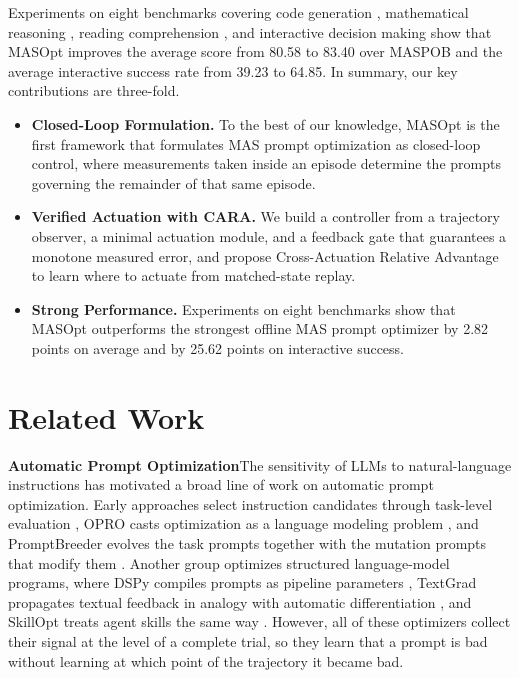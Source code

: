 \documentclass{article}
\theoremstyle{definition}
\begin{document}
Experiments on eight benchmarks covering code generation \citep{chen2021humaneval,austin2021mbpp}, mathematical reasoning \citep{cobbe2021gsm8k,hendrycks2021math}, reading comprehension \citep{yang2018hotpotqa,dua2019drop}, and interactive decision making \citep{shridhar2020alfworld,prasad2024textcraft} show that MASOpt improves the average score from 80.58 to 83.40 over MASPOB \citep{hong2026maspob} and the average interactive success rate from 39.23 to 64.85. In summary, our key contributions are three-fold.
\begin{itemize}[leftmargin=1em, itemsep=-1ex, topsep=0ex]
    \item \textbf{Closed-Loop Formulation.} To the best of our knowledge, MASOpt is the first framework that formulates MAS prompt optimization as closed-loop control, where measurements taken inside an episode determine the prompts governing the remainder of that same episode.
    \item \textbf{Verified Actuation with CARA.} We build a controller from a trajectory observer, a minimal actuation module, and a feedback gate that guarantees a monotone measured error, and propose Cross-Actuation Relative Advantage to learn where to actuate from matched-state replay.
    \item \textbf{Strong Performance.} Experiments on eight benchmarks show that MASOpt outperforms the strongest offline MAS prompt optimizer by 2.82 points on average and by 25.62 points on interactive success.
\end{itemize}

\section{Related Work}
\label{sec:related_work}

\textbf{Automatic Prompt Optimization}\quad The sensitivity of LLMs to natural-language instructions has motivated a broad line of work on automatic prompt optimization. Early approaches select instruction candidates through task-level evaluation \citep{zhou2022ape,pryzant2023automatic}, OPRO casts optimization as a language modeling problem \citep{yang2024opro}, and PromptBreeder evolves the task prompts together with the mutation prompts that modify them \citep{fernando2024promptbreeder,lin2023instinct}. Another group optimizes structured language-model programs, where DSPy compiles prompts as pipeline parameters \citep{khattab2024dspy}, TextGrad propagates textual feedback in analogy with automatic differentiation \citep{yuksekgonul2024textgrad,agrawal2025textgrad}, and SkillOpt treats agent skills the same way \citep{yang2026skillopt}. However, all of these optimizers collect their signal at the level of a complete trial, so they learn that a prompt is bad without learning at which point of the trajectory it became bad.
\end{document}
